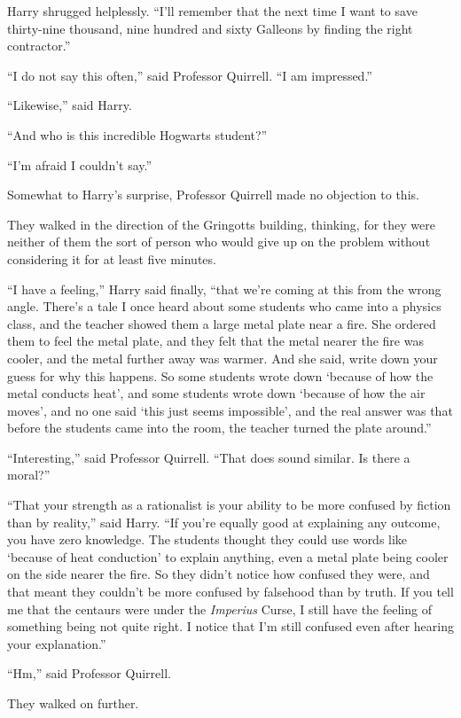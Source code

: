 Harry shrugged helplessly. ``I'll remember that the next time I want to save thirty-nine thousand, nine hundred and sixty Galleons by finding the right contractor.''

``I do not say this often,'' said Professor Quirrell. ``I am impressed.''

``Likewise,'' said Harry.

``And who is this incredible Hogwarts student?''

``I'm afraid I couldn't say.''

Somewhat to Harry's surprise, Professor Quirrell made no objection to this.

They walked in the direction of the Gringotts building, thinking, for they were neither of them the sort of person who would give up on the problem without considering it for at least five minutes.

``I have a feeling,'' Harry said finally, ``that we're coming at this from the wrong angle. There's a tale I once heard about some students who came into a physics class, and the teacher showed them a large metal plate near a fire. She ordered them to feel the metal plate, and they felt that the metal nearer the fire was cooler, and the metal further away was warmer. And she said, write down your guess for why this happens. So some students wrote down `because of how the metal conducts heat', and some students wrote down `because of how the air moves', and no one said `this just seems impossible', and the real answer was that before the students came into the room, the teacher turned the plate around.''

``Interesting,'' said Professor Quirrell. ``That does sound similar. Is there a moral?''

``That your strength as a rationalist is your ability to be more confused by fiction than by reality,'' said Harry. ``If you're equally good at explaining any outcome, you have zero knowledge. The students thought they could use words like `because of heat conduction' to explain anything, even a metal plate being cooler on the side nearer the fire. So they didn't notice how confused they were, and that meant they couldn't be more confused by falsehood than by truth. If you tell me that the centaurs were under the \emph{Imperius} Curse, I still have the feeling of something being not quite right. I notice that I'm still confused even after hearing your explanation.''

``Hm,'' said Professor Quirrell.

They walked on further.

